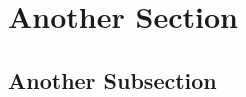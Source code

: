 \chapter{Another Section}\label{another_section}

\section{Another Subsection}\label{another_subsection}
\lipsum[3]